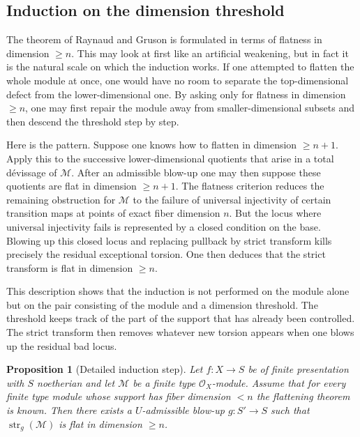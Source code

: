 \documentclass[11pt,oneside]{article}
\newtheorem{proposition}[theorem]{Proposition}
\newcommand{\M}{\mathcal M}
\newcommand{\OO}{\mathcal O}
\newcommand{\st}{\operatorname{str}}
\begin{document}
\subsection{Induction on the dimension threshold}

The theorem of Raynaud and Gruson is formulated in terms of flatness in dimension $\ge n$.  This may look at first like an artificial weakening, but in fact it is the natural scale on which the induction works.  If one attempted to flatten the whole module at once, one would have no room to separate the top-dimensional defect from the lower-dimensional one.  By asking only for flatness in dimension $\ge n$, one may first repair the module away from smaller-dimensional subsets and then descend the threshold step by step.

Here is the pattern.  Suppose one knows how to flatten in dimension $\ge n+1$.  Apply this to the successive lower-dimensional quotients that arise in a total d\'evissage of $\M$.  After an admissible blow-up one may then suppose these quotients are flat in dimension $\ge n+1$.  The flatness criterion reduces the remaining obstruction for $\M$ to the failure of universal injectivity of certain transition maps at points of exact fiber dimension $n$.  But the locus where universal injectivity fails is represented by a closed condition on the base.  Blowing up this closed locus and replacing pullback by strict transform kills precisely the residual exceptional torsion.  One then deduces that the strict transform is flat in dimension $\ge n$.

This description shows that the induction is not performed on the module alone but on the pair consisting of the module and a dimension threshold.  The threshold keeps track of the part of the support that has already been controlled.  The strict transform then removes whatever new torsion appears when one blows up the residual bad locus.

\begin{proposition}[Detailed induction step]\label{prop:induction-step-long}
Let $f\colon X\to S$ be of finite presentation with $S$ noetherian and let $\M$ be a finite type $\OO_X$-module.  Assume that for every finite type module whose support has fiber dimension $<n$ the flattening theorem is known.  Then there exists a $U$-admissible blow-up $g\colon S'\to S$ such that $\st_g(\M)$ is flat in dimension $\ge n$.
\end{proposition}
\end{document}
